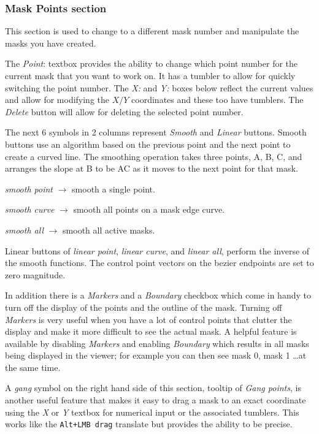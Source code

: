 \subsubsection*{Mask Points section}%
\label{ssub:masks_points_section}

This section is used to change to a different mask number and manipulate the masks you have created.

The \textit{Point}: textbox provides the ability to change which point number for the current mask that you want to work on.  It has a tumbler to allow for quickly switching the point number.  The \textit{X:} and \textit{Y:} boxes below reflect the current values and allow for modifying the $X/Y$ coordinates and these too have tumblers. The \textit{Delete} button will allow for deleting the selected point number.

The next 6 symbols in 2 columns represent \textit{Smooth} and \textit{Linear} buttons.  Smooth buttons use an algorithm based on the previous point and the next point to create a curved line. The smoothing operation takes three points, A, B, C, and arranges the slope at B to be AC as it moves to the next point for that mask.

\textit{smooth point}	$\rightarrow$ smooth a single point.

\textit{smooth curve}	$\rightarrow$ smooth all points on a mask edge curve.

\textit{smooth all} 	$\rightarrow$ smooth all active masks.

Linear buttons of \textit{linear point}, \textit{linear curve}, and \textit{linear all}, perform the inverse of the smooth functions.
The control point vectors on the bezier endpoints are set to zero magnitude.

In addition there is a \textit{Markers} and a \textit{Boundary} checkbox which come in handy to turn off the display of the points and the outline of the mask.  Turning off \textit{Markers} is very useful when you have a lot of control points that clutter the display and make it more difficult to see the actual mask.  A helpful feature is available by disabling \textit{Markers} and enabling \textit{Boundary} which results in all masks being displayed in the viewer; for example you can then see mask 0, mask 1 \dots at the same time.

A \textit{gang} symbol on the right hand side of this section, tooltip of \textit{Gang points}, is another useful feature that makes it easy to drag a mask to an exact coordinate using the \textit{X} or \textit{Y} textbox for numerical input or the associated tumblers.  This works like the \texttt{Alt+LMB drag} translate but provides the ability to be precise.


